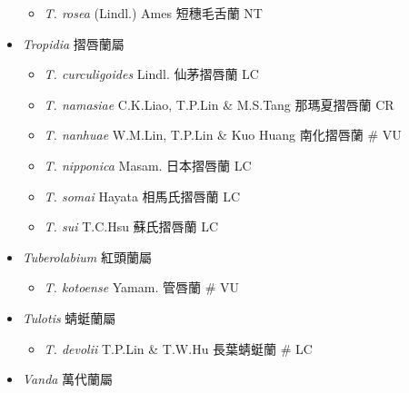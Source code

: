 \begin{itemize}
  \begin{itemize}
        \item[] \textit{T. rosea} (Lindl.) Ames  短穗毛舌蘭   NT
  \end{itemize}
 \item[] \textit{Tropidia} 摺唇蘭屬
                                
  \begin{itemize}
        \item[] \textit{T. curculigoides} Lindl.  仙茅摺唇蘭   LC
        \item[] \textit{T. namasiae} C.K.Liao, T.P.Lin \& M.S.Tang  那瑪夏摺唇蘭   CR
        \item[] \textit{T. nanhuae} W.M.Lin, T.P.Lin \& Kuo Huang  南化摺唇蘭  \# VU
        \item[] \textit{T. nipponica} Masam.  日本摺唇蘭   LC
        \item[] \textit{T. somai} Hayata  相馬氏摺唇蘭   LC
        \item[] \textit{T. sui} T.C.Hsu  蘇氏摺唇蘭   LC
  \end{itemize}
 \item[] \textit{Tuberolabium} 紅頭蘭屬
                                
  \begin{itemize}
        \item[] \textit{T. kotoense} Yamam.  管唇蘭  \# VU
  \end{itemize}
 \item[] \textit{Tulotis} 蜻蜓蘭屬
                                
  \begin{itemize}
        \item[] \textit{T. devolii} T.P.Lin \& T.W.Hu  長葉蜻蜓蘭  \# LC
  \end{itemize}
 \item[] \textit{Vanda} 萬代蘭屬
                                

\end{itemize}
